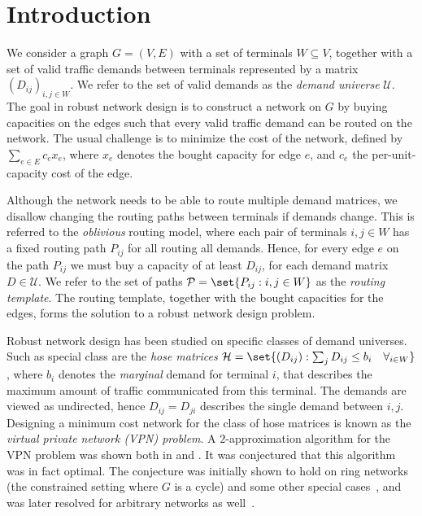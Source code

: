 \documentclass[11pt]{article}
\theoremstyle{definition}
\begin{document}
    \section{Introduction} \label{sec:introduction}
    We consider a graph $G = (V, E)$ with a set of terminals $W \subseteq V$, together with a set of valid traffic demands between terminals represented by a matrix $(D_{ij})_{i,j \in W}$.
    We refer to the set of valid demands as the \emph{demand universe} $\mathcal U$.
    The goal in robust network design is to construct a network on $G$ by buying capacities on the edges such that every valid traffic demand can be routed on the network.
    The usual challenge is to minimize the cost of the network, defined by $\sum_{e \in E} c_e x_e$, where $x_e$ denotes the bought capacity for edge $e$, and $c_e$ the per-unit-capacity cost of the edge.

    Although the network needs to be able to route multiple demand matrices, we disallow changing the routing paths between terminals if demands change.
    This is referred to the \emph{oblivious} routing model, where each pair of terminals $i,j \in W$ has a fixed routing path $P_{ij}$ for all routing all demands.
    Hence, for every edge $e$ on the path $P_{ij}$ we must buy a capacity of at least $D_{ij}$, for each demand matrix $D \in \mathcal U$.
    We refer to the set of paths $\mathcal P = \set{P_{ij} : i,j \in W}$ as the \emph{routing template}.
    The routing template, together with the bought capacities for the edges, forms the solution to a robust network design problem.

    Robust network design has been studied on specific classes of demand universes.
    Such as special class are the \emph{hose matrices} $\mathcal H = \set{(D_{ij}) : \sum_j D_{ij} \le b_i \quad \forall_{i \in W}}$, where $b_i$ denotes the \emph{marginal} demand for terminal $i$, that describes the maximum amount of traffic communicated from this terminal.
    The demands are viewed as undirected, hence $D_{ij} = D_{ji}$ describes the single demand between $i,j$.
    Designing a minimum cost network for the class of hose matrices is known as the \emph{virtual private network (VPN) problem}.
    A $2$-approximation algorithm for the VPN problem was shown both in \cite{} and \cite{}.
    It was conjectured \cite{} that this algorithm was in fact optimal.
    The conjecture was initially shown to hold on ring networks (the constrained setting where $G$ is a cycle) and some other special cases~\cite{}, and was later resolved for arbitrary networks as well~\cite{}.
\end{document}
